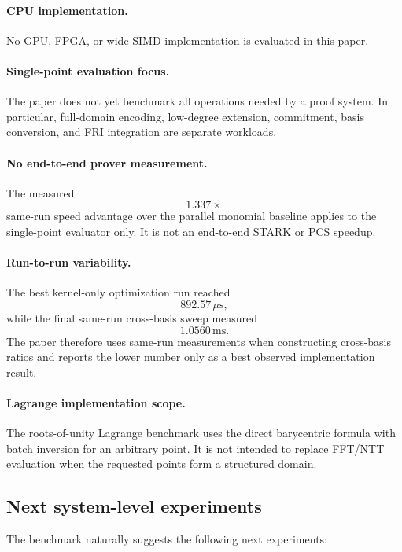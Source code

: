 \paragraph{CPU implementation.}
No GPU, FPGA, or wide-SIMD implementation is evaluated in this paper.

\paragraph{Single-point evaluation focus.}
The paper does not yet benchmark all operations needed by a proof system.
In particular, full-domain encoding, low-degree extension, commitment,
basis conversion, and FRI integration are separate workloads.

\paragraph{No end-to-end prover measurement.}
The measured
\[
1.337\times
\]
same-run speed advantage over the parallel monomial baseline applies to the
single-point evaluator only.  It is not an end-to-end STARK or PCS speedup.

\paragraph{Run-to-run variability.}
The best kernel-only optimization run reached
\[
892.57\,\mu\mathrm{s},
\]
while the final same-run cross-basis sweep measured
\[
1.0560\,\mathrm{ms}.
\]
The paper therefore uses same-run measurements when constructing
cross-basis ratios and reports the lower number only as a best observed
implementation result.

\paragraph{Lagrange implementation scope.}
The roots-of-unity Lagrange benchmark uses the direct barycentric formula
with batch inversion for an arbitrary point.  It is not intended to replace
FFT/NTT evaluation when the requested points form a structured domain.

\subsection{Next system-level experiments}

The benchmark naturally suggests the following next experiments:

